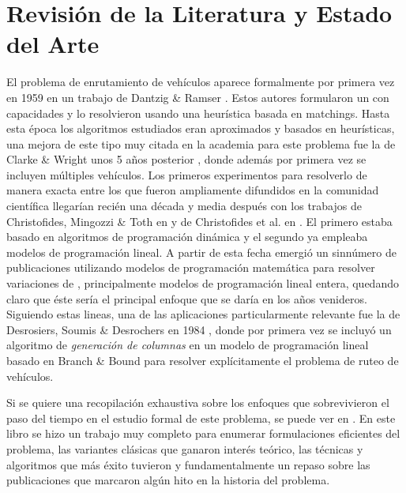 \section{Revisión de la Literatura y Estado del Arte}

El problema de enrutamiento de vehículos aparece formalmente por primera vez en 1959 en un trabajo de Dantzig \& Ramser \cite{dantzig-ramser}. Estos autores formularon un  con capacidades y lo resolvieron usando una heurística basada en matchings. Hasta esta época los algoritmos estudiados eran aproximados y basados en heurísticas, una mejora de este tipo muy citada en la academia para este problema fue la de Clarke \& Wright unos 5 años posterior \cite{clarke-wright}, donde además por primera vez se incluyen múltiples vehículos. Los primeros experimentos para resolverlo de manera exacta entre los que fueron ampliamente difundidos en la comunidad científica llegarían recién una década y media después con los trabajos de Christofides, Mingozzi \& Toth en \cite{christo-mingozzi-toth} y de Christofides et al. en \cite{christo-et-al}. El primero estaba basado en algoritmos de programación dinámica y el segundo ya empleaba modelos de programación lineal. A partir de esta fecha emergió un sinnúmero de publicaciones utilizando modelos de programación matemática para resolver variaciones de , principalmente modelos de programación lineal entera, quedando claro que éste sería el principal enfoque que se daría en los años venideros. Siguiendo estas lineas, una de las aplicaciones particularmente relevante fue la de Desrosiers, Soumis \& Desrochers en 1984 \cite{desrosiers-soumis-desrochers}, donde por primera vez se incluyó un algoritmo de \emph{generación de columnas} en un modelo de programación lineal basado en Branch \& Bound para resolver explícitamente el problema de ruteo de vehículos.
  
Si se quiere una recopilación exhaustiva sobre los enfoques que sobrevivieron el paso del tiempo en el estudio formal de este problema, se puede ver en \cite{toth-vigo}. En este libro se hizo un trabajo muy completo para enumerar formulaciones eficientes del problema, las variantes clásicas que ganaron interés teórico, las técnicas y algoritmos que más éxito tuvieron y fundamentalmente un repaso sobre las publicaciones que marcaron algún hito en la historia del problema.

